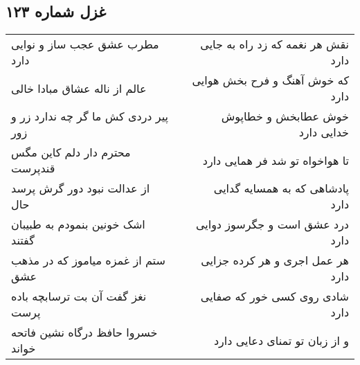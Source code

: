 \begin{center}
\section*{غزل شماره ۱۲۳}
\label{sec:sh123}
\begin{longtable}{l p{0.5cm} r}
مطرب عشق عجب ساز و نوایی دارد
&&
نقش هر نغمه که زد راه به جایی دارد
\\
عالم از ناله عشاق مبادا خالی
&&
که خوش آهنگ و فرح بخش هوایی دارد
\\
پیر دردی کش ما گر چه ندارد زر و زور
&&
خوش عطابخش و خطاپوش خدایی دارد
\\
محترم دار دلم کاین مگس قندپرست
&&
تا هواخواه تو شد فر همایی دارد
\\
از عدالت نبود دور گرش پرسد حال
&&
پادشاهی که به همسایه گدایی دارد
\\
اشک خونین بنمودم به طبیبان گفتند
&&
درد عشق است و جگرسوز دوایی دارد
\\
ستم از غمزه میاموز که در مذهب عشق
&&
هر عمل اجری و هر کرده جزایی دارد
\\
نغز گفت آن بت ترسابچه باده پرست
&&
شادی روی کسی خور که صفایی دارد
\\
خسروا حافظ درگاه نشین فاتحه خواند
&&
و از زبان تو تمنای دعایی دارد
\\
\end{longtable}
\end{center}
